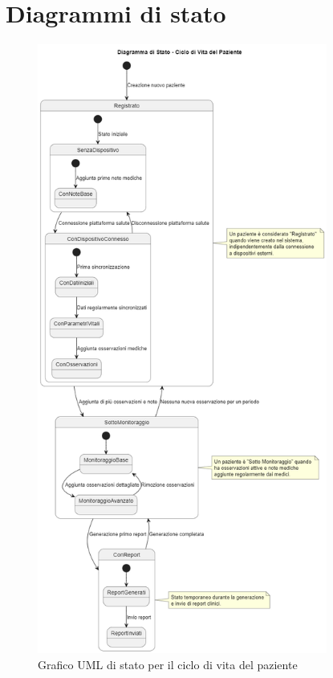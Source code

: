\documentclass[12pt,a4paper,oneside]{report}
\begin{document}
\section{Diagrammi di stato}
\begin{figure}[H]
    \centering
    \includegraphics[width=0.85\textwidth]{images/uml/PatientLifecycle.png}
    \caption{Grafico UML di stato per il ciclo di vita del paziente}
    \label{fig:uml-state-graph}
\end{figure}
\end{document}
